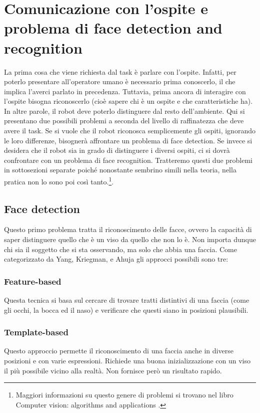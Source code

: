 \documentclass[italian, twoside]{sapthesis} %
\begin{document}
\section{Comunicazione con l'ospite e problema di face detection and recognition}
La prima cosa che viene richiesta dal task è parlare con l'ospite. Infatti, per poterlo presentare all'operatore umano è necessario prima conoscerlo, il che implica l’averci parlato in precedenza. Tuttavia, prima ancora di interagire con l’ospite bisogna riconoscerlo (cioè sapere chi è un ospite e che caratteristiche ha). In altre parole, il robot deve poterlo distinguere dal resto dell’ambiente. Qui si presentano due possibili problemi a seconda del livello di raffinatezza che deve avere il task. Se si vuole che il robot riconosca semplicemente gli ospiti, ignorando le loro differenze, bisognerà affrontare un problema di face detection. Se invece si desidera che il robot sia in grado di distinguere i diversi ospiti, ci si dovrà confrontare con un problema di face recognition. Tratteremo questi due problemi in sottosezioni separate poiché nonostante sembrino simili nella teoria, nella pratica non lo sono poi così tanto.\footnote{Maggiori informazioni su questo genere di problemi si trovano nel libro Computer vision: algorithms and applications \cite{szeliski2022computer}.}.

\subsection{Face detection}
Questo primo problema tratta il riconoscimento delle facce, ovvero la capacità di saper distinguere quello che è un viso da quello che non lo è. Non importa dunque chi sia il soggetto che si sta osservando, ma solo che abbia una faccia. Come categorizzato da Yang, Kriegman, e Ahuja \cite{yang2002detecting} gli approcci possibili sono tre:

\subsubsection{Feature-based}
Questa tecnica si basa sul cercare di trovare tratti distintivi di una faccia (come gli occhi, la bocca ed il naso) e verificare che questi siano in posizioni plausibili.
\subsubsection{Template-based}
Questo approccio permette il riconoscimento di una faccia anche in diverse posizioni e con varie espressioni. Richiede una buona inizializzazione con un viso il più possibile vicino alla realtà. Non fornisce però un risultato rapido.
\end{document}
